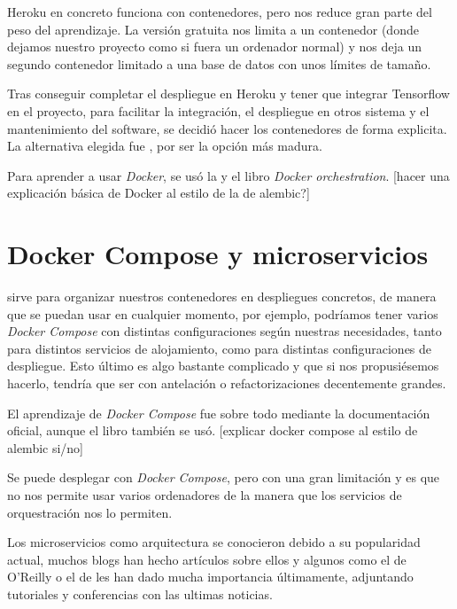 Heroku en concreto funciona con contenedores, pero nos reduce gran parte del peso del aprendizaje. La versión gratuita nos limita a un contenedor (donde dejamos nuestro proyecto como si fuera un ordenador normal) y nos deja un segundo contenedor limitado a una base de datos  con unos límites de tamaño. 

Tras conseguir completar el despliegue en Heroku y tener que integrar Tensorflow en el proyecto, para facilitar la integración, el despliegue en otros sistema y el mantenimiento del software, se decidió hacer los contenedores de forma explicita. La alternativa elegida fue , por ser la opción más madura. 

Para aprender a usar \emph{Docker}, se usó la  y el libro \emph{Docker orchestration}\cite{ran17}. [hacer una explicación básica de Docker al estilo de la de alembic?]

\section{Docker Compose y microservicios}

 sirve para organizar nuestros contenedores en despliegues concretos, de manera que se puedan usar en cualquier momento, por ejemplo, podríamos tener varios \emph{Docker Compose} con distintas configuraciones según nuestras necesidades, tanto para distintos servicios de alojamiento, como para distintas configuraciones de despliegue. Esto último es algo bastante complicado y que si nos propusiésemos hacerlo, tendría que ser con antelación o refactorizaciones decentemente grandes.

El aprendizaje de \emph{Docker Compose} fue sobre todo mediante la documentación oficial, aunque el libro \cite{ran17} también se usó. [explicar docker compose al estilo de alembic si/no] 

Se puede desplegar con \emph{Docker Compose}, pero con una gran limitación y es que no nos permite usar varios ordenadores de la manera que los servicios de orquestración nos lo permiten.

Los microservicios como arquitectura se conocieron debido a su popularidad actual, muchos blogs han hecho artículos sobre ellos y algunos  como el de O'Reilly o el de  les han dado mucha importancia últimamente, adjuntando tutoriales y conferencias con las ultimas noticias.


